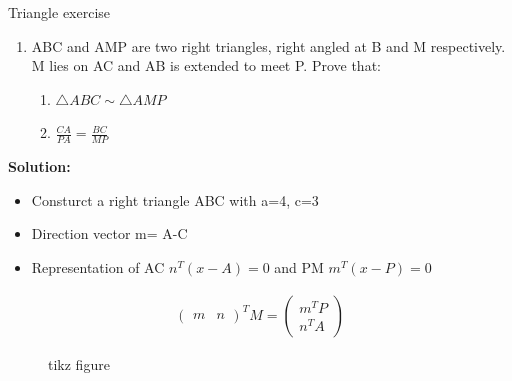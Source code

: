 \begin{frame}{Triangle exercise}
\begin{enumerate}
\item ABC and AMP are two right triangles, right angled at B and M respectively. M lies on AC and AB is extended to meet P. Prove that:
\seti
\begin{enumerate}
\item $\triangle{ABC} \sim \triangle{AMP}$
\item $\frac{CA}{PA}=\frac{BC}{MP}$
\end{enumerate}
\end{enumerate}
\textbf{Solution:}
\begin{itemize}
\item Consturct a right triangle ABC with a=4, c=3
\item Direction vector m= A-C
\item Representation of AC $n^T(x-A)=0$ and PM $m^T(x-P)=0$
\end{itemize}
\begin{align}
\begin{pmatrix}
m & n
\end{pmatrix}^T M=\begin{pmatrix}
m^T P\\
n^T A
\end{pmatrix}
\end{align}
\end{frame}
\begin{frame}
\begin{figure}[!ht]
\resizebox{.7\linewidth}{!}
{


}
\caption{tikz figure}
\label{fig:foo}
\end{figure}
\end{frame}
